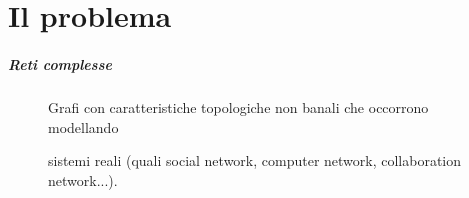 \part{Il problema}

\begin{frame}
	\partpage
	\centering
\end{frame}

\begin{frame}
	\frametitle{Reti complesse}
	\centering
	\begin{figure}[h]
		\centering
		\begin{flushleft}
			Grafi con caratteristiche topologiche non banali che occorrono modellando 
			
			sistemi reali (quali social network, computer network, collaboration network...).
		\end{flushleft}
		\medskip
		

\end{figure}
\end{frame}
